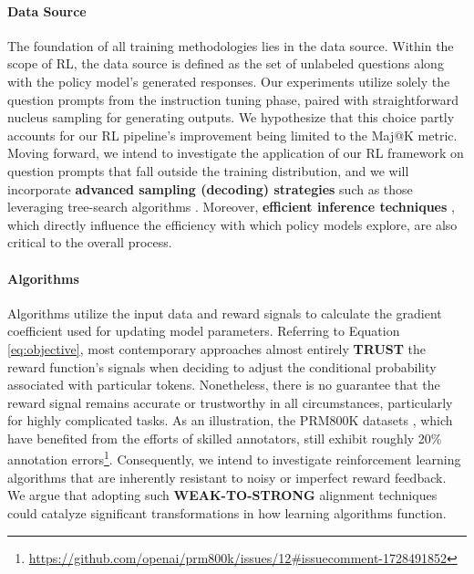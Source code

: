 \begin{itemize}[topsep=0pt]
\paragraph{Data Source} The foundation of all training methodologies lies in the data source. Within the scope of RL, the data source is defined as the set of unlabeled questions along with the policy model’s generated responses. Our experiments utilize solely the question prompts from the instruction tuning phase, paired with straightforward nucleus sampling for generating outputs. We hypothesize that this choice partly accounts for our RL pipeline’s improvement being limited to the Maj@K metric. Moving forward, we intend to investigate the application of our RL framework on question prompts that fall outside the training distribution, and we will incorporate \textbf{advanced sampling (decoding) strategies} such as those leveraging tree-search algorithms \citep{yao2023tree}. Moreover, \textbf{efficient inference techniques} \citep{xia-etal-2023-speculative,leviathan2023fast,kwon2023efficient,xia2024unlocking}, which directly influence the efficiency with which policy models explore, are also critical to the overall process.

\paragraph{Algorithms} Algorithms utilize the input data and reward signals to calculate the gradient coefficient used for updating model parameters. Referring to Equation \ref{eq:objective}, most contemporary approaches almost entirely \textbf{TRUST} the reward function’s signals when deciding to adjust the conditional probability associated with particular tokens. Nonetheless, there is no guarantee that the reward signal remains accurate or trustworthy in all circumstances, particularly for highly complicated tasks. As an illustration, the PRM800K datasets \citep{lightman2023let}, which have benefited from the efforts of skilled annotators, still exhibit roughly 20\% annotation errors\footnote{\url{https://github.com/openai/prm800k/issues/12\#issuecomment-1728491852}}. Consequently, we intend to investigate reinforcement learning algorithms that are inherently resistant to noisy or imperfect reward feedback. We argue that adopting such \textbf{WEAK-TO-STRONG} \citep{burns2023weak} alignment techniques could catalyze significant transformations in how learning algorithms function.


\end{itemize}
